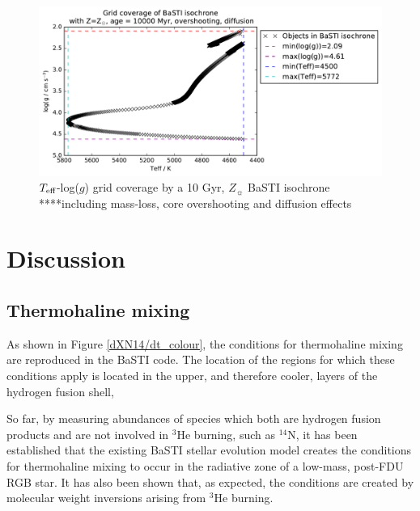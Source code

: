 \documentclass[usenatbib]{mnras}
\begin{document}
\begin{figure}
\includegraphics[scale=0.4]{../wfc3_16_23Myr_10Gyr_complex_solar/wfc3_ATLAS9_grid_BaSTI_coverage_c10000_complex_Zsol_4500.pdf}
\caption{$T_{\textnormal{eff}}$-log($g$) grid coverage by a 10 Gyr, $Z_{\sun}$ BaSTI isochrone ****including mass-loss, core overshooting and diffusion effects}
\label{BaSTI_coverage_10G}
\end{figure}




\citet{2004astro.ph..5087C}


\section{Discussion}
\subsection{Thermohaline mixing}
As shown in Figure \ref{dXN14/dt_colour}, the conditions for thermohaline mixing are reproduced in the BaSTI code. The location of the regions for which these conditions apply is located in the upper, and therefore cooler, layers of the hydrogen fusion shell,

So far, by measuring abundances of species which both are hydrogen fusion products and are not involved in $^3$He burning, such as $^{14}$N, it has been established that the existing BaSTI stellar evolution model creates the conditions for thermohaline mixing to occur in the radiative zone of a low-mass, post-FDU RGB star. It has also been shown that, as expected, the conditions are created by molecular weight inversions arising from $^{3}$He burning.
\end{document}
